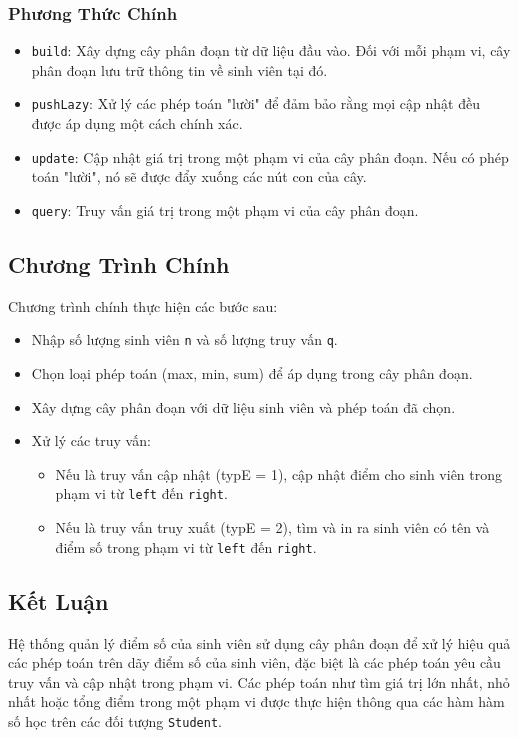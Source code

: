 \documentclass[a4paper]{article}
\begin{document}
\subsubsection{Phương Thức Chính}

\begin{itemize}[label = $\circ$]
  \item \texttt{build}: Xây dựng cây phân đoạn từ dữ liệu đầu vào. Đối với mỗi phạm vi, cây phân đoạn lưu trữ thông tin về sinh viên tại đó.
  \item \texttt{pushLazy}: Xử lý các phép toán "lười" để đảm bảo rằng mọi cập nhật đều được áp dụng một cách chính xác.
  \item \texttt{update}: Cập nhật giá trị trong một phạm vi của cây phân đoạn. Nếu có phép toán "lười", nó sẽ được đẩy xuống các nút con của cây.
  \item \texttt{query}: Truy vấn giá trị trong một phạm vi của cây phân đoạn.
\end{itemize}

\subsection{Chương Trình Chính}

\hspace{0.5cm}Chương trình chính thực hiện các bước sau:
\begin{itemize}[label = $\circ$]
  \item Nhập số lượng sinh viên \texttt{n} và số lượng truy vấn \texttt{q}.
  \item Chọn loại phép toán (max, min, sum) để áp dụng trong cây phân đoạn.
  \item Xây dựng cây phân đoạn với dữ liệu sinh viên và phép toán đã chọn.
  \item Xử lý các truy vấn:
  \begin{itemize}[label = $\bullet$]
    \item Nếu là truy vấn cập nhật (typE = 1), cập nhật điểm cho sinh viên trong phạm vi từ \texttt{left} đến \texttt{right}.
    \item Nếu là truy vấn truy xuất (typE = 2), tìm và in ra sinh viên có tên và điểm số trong phạm vi từ \texttt{left} đến \texttt{right}.
  \end{itemize}
\end{itemize}

\subsection{Kết Luận}
Hệ thống quản lý điểm số của sinh viên sử dụng cây phân đoạn để xử lý hiệu quả các phép toán trên dãy điểm số của sinh viên, đặc biệt là các phép toán yêu cầu truy vấn và cập nhật trong phạm vi. Các phép toán như tìm giá trị lớn nhất, nhỏ nhất hoặc tổng điểm trong một phạm vi được thực hiện thông qua các hàm hàm số học trên các đối tượng \texttt{Student}.
\end{document}
